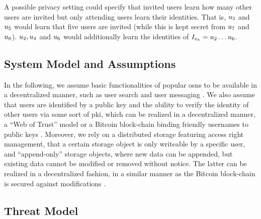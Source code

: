 A possible privacy setting
could specify that invited users learn how many other users are invited
but only attending users learn their identities. That is, $\u[3]$
and $\u[5]$ would learn that five users are invited (while this is kept
secret from $\u[7]$ and $\u[8]$). $\u[2], \u[4]$ and $\u[6]$
would additionally learn the identities of $\I = \u[2] \dots \u[6]$.

\subsection{System Model and Assumptions}
	\label{subsection:event-invitations-dosns:system-model-and-assumptions}
In the following, we
assume basic functionalities of popular \Acp{osn} to be available in 
a decentralized manner, such as user 
search \cite{GreschbachKB2013} and user messaging \cite{RowstronD2001}.
%
We also assume that users are identified by a public key and the ability  
to verify the identity of other users via some sort of \Ac{pki}, which can 
be realized in a decentralized manner, \eg a ``Web of Trust'' model or a Bitcoin 
block-chain binding friendly usernames to public keys \cite{Freitas2013}. 
%
Moreover, we rely on a distributed storage
featuring access right management, \eg that a certain storage object is
only writeable by a specific user, and ``append-only'' storage objects,
where new data can be appended, but existing data cannot be modified or
removed without notice. The latter can be realized in a decentralized
fashion, \eg in a similar manner as the Bitcoin block-chain is secured
against modifications \cite{Nakamoto08}. 


\subsection{Threat Model}
	\label{subsection:event-invitations-dosns:threat-model}

